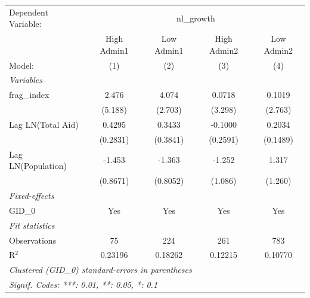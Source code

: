
\begingroup
\centering
\begin{tabular}{lcccc}
   \tabularnewline \midrule \midrule
   Dependent Variable: & \multicolumn{4}{c}{nl\_growth}\\
                      & High Admin1 & Low Admin1 & High Admin2 & Low Admin2 \\   
   Model:             & (1)         & (2)        & (3)         & (4)\\  
   \midrule
   \emph{Variables}\\
   frag\_index        & 2.476       & 4.074      & 0.0718      & 0.1019\\   
                      & (5.188)     & (2.703)    & (3.298)     & (2.763)\\   
   Lag LN(Total Aid)  & 0.4295      & 0.3433     & -0.1000     & 0.2034\\   
                      & (0.2831)    & (0.3841)   & (0.2591)    & (0.1489)\\   
   Lag LN(Population) & -1.453      & -1.363     & -1.252      & 1.317\\   
                      & (0.8671)    & (0.8052)   & (1.086)     & (1.260)\\   
   \midrule
   \emph{Fixed-effects}\\
   GID\_0             & Yes         & Yes        & Yes         & Yes\\  
   \midrule
   \emph{Fit statistics}\\
   Observations       & 75          & 224        & 261         & 783\\  
   R$^2$              & 0.23196     & 0.18262    & 0.12215     & 0.10770\\  
   \midrule \midrule
   \multicolumn{5}{l}{\emph{Clustered (GID\_0) standard-errors in parentheses}}\\
   \multicolumn{5}{l}{\emph{Signif. Codes: ***: 0.01, **: 0.05, *: 0.1}}\\
\end{tabular}
\par\endgroup


